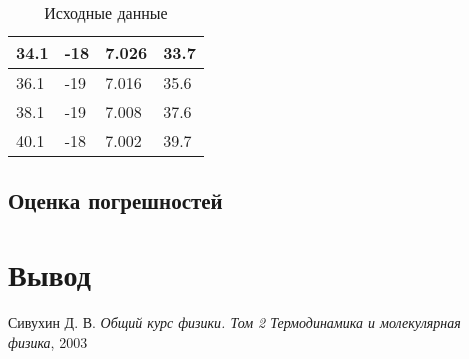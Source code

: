 \documentclass[a4paper]{article}
\begin{document}
\begin{table}[]
\begin{tabular}{|l|l|l|l|}
		34.1                                                 & -18                                          & 7.026                                & 33.7                                               \\ \hline
		36.1                                                 & -19                                          & 7.016                                & 35.6                                               \\ \hline
		38.1                                                 & -19                                          & 7.008                                & 37.6                                               \\ \hline
		40.1                                                 & -18                                          & 7.002                                & 39.7                                               \\ \hline
	\end{tabular}
	\caption{Исходные данные}
\end{table}



\subsection{Оценка погрешностей}

\section{Вывод}

\begin{thebibliography}{9}
 Сивухин Д. В. \emph{Общий курс физики. Том 2 Термодинамика и молекулярная физика}, 2003
\end{thebibliography}
\end{document}
